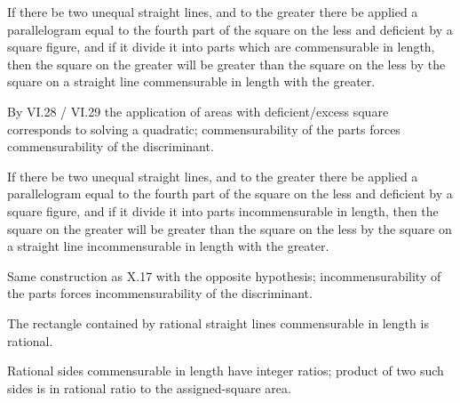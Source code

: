 \begin{claim}
\label{prop:X.17}
If there be two unequal straight lines, and to the greater there be
applied a parallelogram equal to the fourth part of the square on the
less and deficient by a square figure, and if it divide it into parts
which are commensurable in length, then the square on the greater
will be greater than the square on the less by the square on a
straight line commensurable in length with the greater.
\end{claim}
\begin{evidence}[Proof of X.17]
\label{ev:X.17}
By VI.28 / VI.29 the application of areas with deficient/excess
square corresponds to solving a quadratic; commensurability of the
parts forces commensurability of the discriminant.
\end{evidence}

\begin{claim}
\label{prop:X.18}
If there be two unequal straight lines, and to the greater there be
applied a parallelogram equal to the fourth part of the square on the
less and deficient by a square figure, and if it divide it into parts
incommensurable in length, then the square on the greater will be
greater than the square on the less by the square on a straight line
incommensurable in length with the greater.
\end{claim}
\begin{evidence}[Proof of X.18]
\label{ev:X.18}
Same construction as X.17 with the opposite hypothesis;
incommensurability of the parts forces incommensurability of the
discriminant.
\end{evidence}

\begin{claim}
\label{prop:X.19}
The rectangle contained by rational straight lines commensurable in
length is rational.
\end{claim}
\begin{evidence}[Proof of X.19]
\label{ev:X.19}
Rational sides commensurable in length have integer ratios; product
of two such sides is in rational ratio to the assigned-square area.
\end{evidence}

